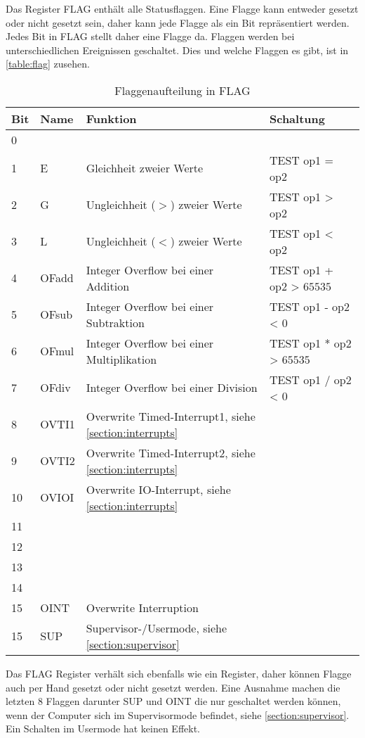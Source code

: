 \documentclass{scrartcl}
\begin{document}
Das Register FLAG enthält alle Statusflaggen.
Eine Flagge kann entweder gesetzt oder nicht gesetzt sein, daher kann jede Flagge als ein Bit repräsentiert werden.
Jedes Bit in FLAG stellt daher eine Flagge da. Flaggen werden bei unterschiedlichen Ereignissen geschaltet.
Dies und welche Flaggen es gibt, ist in \autoref{table:flag} zusehen.

\begin{center}
	\begin{table}[h]
		\caption{\label{table:flag}Flaggenaufteilung in FLAG}
		\begin{tabular}{l | l | l | l}
			Bit & Name & Funktion & Schaltung \\
			\hline
			 0 &  &  & \\
			 1 & E     & Gleichheit zweier Werte 					& TEST op1 = op2\\
			 2 & G     & Ungleichheit ($>$) zweier Werte 			& TEST op1 > op2\\
			 3 & L     & Ungleichheit ($<$) zweier Werte 			& TEST op1 < op2\\
			 4 & OFadd & Integer Overflow bei einer Addition 		& TEST op1 + op2 > $65535$ \\
			 5 & OFsub & Integer Overflow bei einer Subtraktion 	& TEST op1 - op2 < $0$ \\
			 6 & OFmul & Integer Overflow bei einer Multiplikation 	& TEST op1 * op2 > $65535$\\
			 7 & OFdiv & Integer Overflow bei einer Division 		& TEST op1 / op2 < $0$\\
			 8 & OVTI1 & Overwrite Timed-Interrupt1, siehe \autoref{section:interrupts} &  \\
			 9 & OVTI2 & Overwrite Timed-Interrupt2, siehe \autoref{section:interrupts} &  \\
			10 & OVIOI & Overwrite IO-Interrupt, siehe \autoref{section:interrupts} &  \\
			11 &  &  &  \\
			12 &  &  &  \\
			13 &  &  &  \\
			14 &  &  &  \\
			15 & OINT & Overwrite Interruption &  \\
			15 & SUP & Supervisor-/Usermode, siehe \autoref{section:supervisor} & 
		\end{tabular}
	\end{table}
\end{center}

Das FLAG Register verhält sich ebenfalls wie ein Register, daher können Flagge auch per Hand gesetzt oder nicht gesetzt werden.
Eine Ausnahme machen die letzten 8 Flaggen darunter SUP und OINT die nur geschaltet werden können, wenn der Computer sich im Supervisormode befindet, siehe \autoref{section:supervisor}.
Ein Schalten im Usermode hat keinen Effekt.
\end{document}
